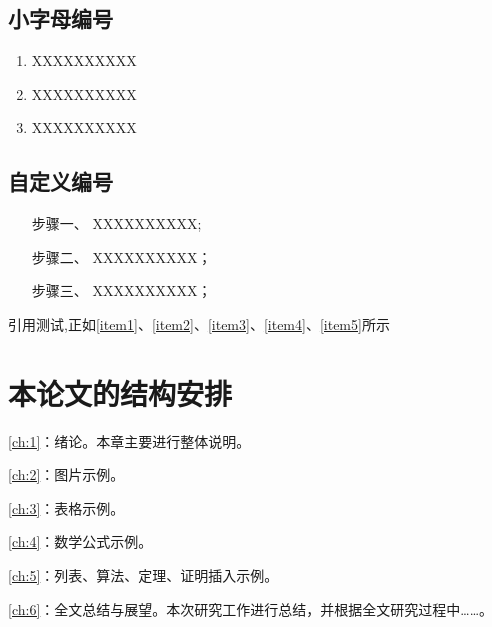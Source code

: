 \subsection{小字母编号}
\begin{enumerate}[label=\alph*)]
 \item XXXXXXXXXX
 \label{item5}
 \item XXXXXXXXXX
 \item XXXXXXXXXX
\end{enumerate}

\subsection{自定义编号}
\begin{enumerate}[leftmargin = 6em, labelsep = 0em]
    \item[步骤一、] XXXXXXXXXX;
    \item[步骤二、] XXXXXXXXXX；
    \item[步骤三、] XXXXXXXXXX；
\end{enumerate}

引用测试,正如\ref{item1}、\ref{item2}、\ref{item3}、\ref{item4}、\ref{item5}所示


\section{本论文的结构安排}
\cref{ch:1}：绪论。本章主要进行整体说明。

\cref{ch:2}：图片示例。

\cref{ch:3}：表格示例。

\cref{ch:4}：数学公式示例。

\cref{ch:5}：列表、算法、定理、证明插入示例。

\cref{ch:6}：全文总结与展望。本次研究工作进行总结，并根据全文研究过程中……。


